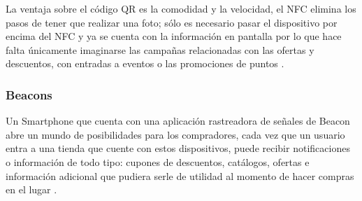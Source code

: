 La ventaja sobre el código QR es la comodidad y la velocidad, el NFC elimina los pasos de tener que realizar una foto; sólo es necesario pasar el dispositivo por encima del NFC y ya se cuenta con la información en pantalla por lo que hace falta únicamente imaginarse las campañas relacionadas con las ofertas y descuentos, con entradas a eventos o las promociones de puntos \cite{MPNFC2}. \\

\subsubsection{Beacons}

Un Smartphone que cuenta con una aplicación rastreadora de señales de Beacon abre un mundo de posibilidades para los compradores, cada vez que un usuario entra a una tienda que cuente con estos dispositivos, puede recibir notificaciones o información de todo tipo: cupones de descuentos, catálogos, ofertas e información adicional que pudiera serle de utilidad al momento de hacer compras en el lugar \cite{MProx}.\\ 